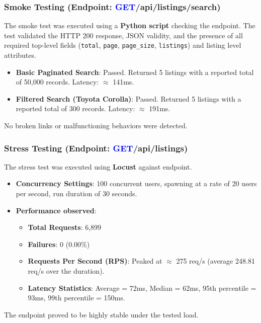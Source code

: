\documentclass[11pt,a4paper]{article}
\newcommand{\getapi}{\textcolor{blue}{GET}}
\newcommand{\bff}[1]{\textbf{#1}}
\begin{document}
 \subsubsection{Smoke Testing (Endpoint: \getapi /api/listings/search)}
 The smoke test was executed using a \bff{Python script} checking the endpoint. The test validated the HTTP 200 response, JSON validity, and the presence of all required top-level fields (\texttt{total}, \texttt{page}, \texttt{page\_size}, \texttt{listings}) and listing level attributes.
 \begin{itemize}
  \item \bff{Basic Paginated Search}: Passed. Returned 5 listings with a reported total of 50,000 records. Latency: $\approx$ 141ms.
  \item \bff{Filtered Search (Toyota Corolla)}: Passed. Returned 5 listings with a reported total of 300 records. Latency: $\approx$ 191ms.
 \end{itemize}
 No broken links or malfunctioning behaviors were detected.
 
 \subsubsection{Stress Testing (Endpoint: \getapi /api/listings)}
 The stress test was executed using \bff{Locust} against endpoint.
 \begin{itemize}
  \item \bff{Concurrency Settings}: 100 concurrent users, spawning at a rate of 20 users per second, run duration of 30 seconds.
  \item \bff{Performance observed}:
  \begin{itemize}
   \item \bff{Total Requests}: 6,899
   \item \bff{Failures}: 0 (0.00\%)
   \item \bff{Requests Per Second (RPS)}: Peaked at $\approx$ 275 req/s (average 248.81 req/s over the duration).
   \item \bff{Latency Statistics}: Average = 72ms, Median = 62ms, 95th percentile = 93ms, 99th percentile = 150ms.
  \end{itemize}
 \end{itemize}
 The endpoint proved to be highly stable under the tested load.
 
\end{document}
